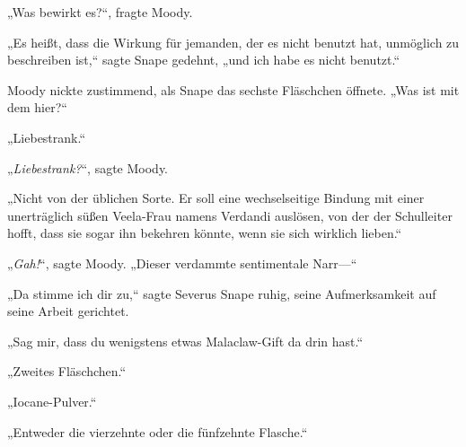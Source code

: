 „Was bewirkt es?“, fragte Moody.

„Es heißt, dass die Wirkung für jemanden, der es nicht benutzt hat, unmöglich zu beschreiben ist,“ sagte Snape gedehnt, „und ich habe es nicht benutzt.“

Moody nickte zustimmend, als Snape das sechste Fläschchen öffnete. „Was ist mit dem hier?“

„Liebestrank.“

„\emph{Liebestrank?}“, sagte Moody.

„Nicht von der üblichen Sorte. Er soll eine wechselseitige Bindung mit einer unerträglich süßen Veela-Frau namens Verdandi auslösen, von der der Schulleiter hofft, dass sie sogar ihn bekehren könnte, wenn sie sich wirklich lieben.“

„\emph{Gah!}“, sagte Moody. „Dieser verdammte sentimentale Narr—“

„Da stimme ich dir zu,“ sagte Severus Snape ruhig, seine Aufmerksamkeit auf seine Arbeit gerichtet.

„Sag mir, dass du wenigstens etwas Malaclaw-Gift da drin hast.“

„Zweites Fläschchen.“

„Iocane-Pulver.“

„Entweder die vierzehnte oder die fünfzehnte Flasche.“

